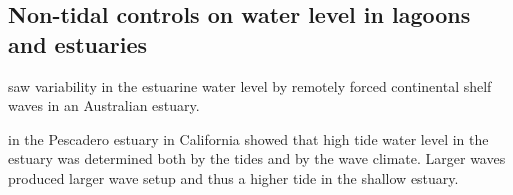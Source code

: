 \documentclass[11pt]{article}
\begin{document}
\subsection*{Non-tidal controls on water level in lagoons and estuaries}

\citet{ocallaghan07} saw variability in the estuarine water level by remotely forced continental shelf waves in an Australian estuary.

\citet{williams16} in the Pescadero estuary in California showed that high tide water level in the estuary was determined both by the tides and by the wave climate. Larger waves produced larger wave setup and thus a higher tide in the shallow estuary.


{}

\end{document}
